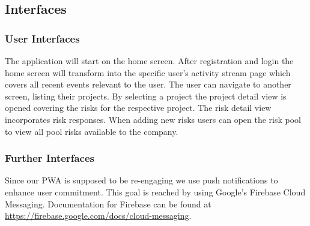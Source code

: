 \subsection{Interfaces}
\label{sec:domainBe}

\subsubsection{User Interfaces}
\label{sec:domainBea}
The application will start on the home screen. After registration and login the home screen will transform into the specific user's activity stream page which covers all recent events relevant to the user. The user can navigate to another screen, listing their projects. By selecting a project the project detail view is opened covering the risks for the respective project. The risk detail view incorporates risk responses.
When adding new risks users can open the risk pool to view all pool risks available to the company.
\subsubsection{Further Interfaces}
\label{sec:domainBeb}
Since our  \acs{PWA} is supposed to be re-engaging we use push notifications to enhance user commitment. This goal is reached by using Google's Firebase Cloud Messaging. Documentation for Firebase can be found at \href{https://firebase.google.com/docs/cloud-messaging}{https://firebase.google.com/docs/cloud-messaging}.

